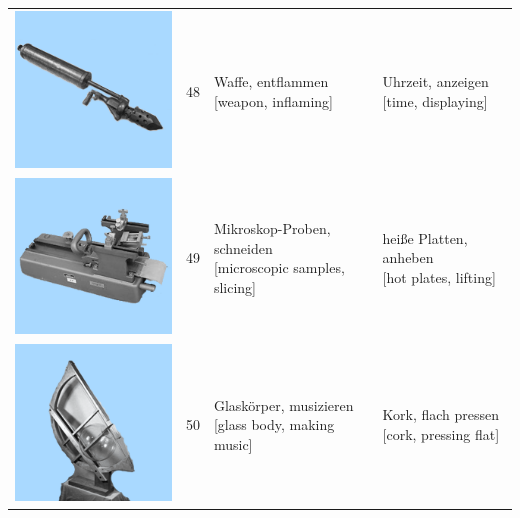 \documentclass[
  english,
  doc,12pt,twoside,floatsintext]{apa7}
\begin{document}
\begin{center}
\begin{ThreePartTable}
{\begin{longtable}{llll}
\includegraphics[valign=c, scale=0.23]{../materials/unfamiliar/48.png} & 48 & \makecell[l]{Waffe, entflammen\\{[weapon, inflaming]}} & \makecell[l]{Uhrzeit, anzeigen\\{[time, displaying]}}\\
\includegraphics[valign=c, scale=0.23]{../materials/unfamiliar/49.png} & 49 & \makecell[l]{Mikroskop-Proben, schneiden\\{[microscopic samples, slicing]}} & \makecell[l]{heiße Platten, anheben\\{[hot plates, lifting]}}\\
\includegraphics[valign=c, scale=0.23]{../materials/unfamiliar/50.png} & 50 & \makecell[l]{Glaskörper, musizieren\\{[glass body, making music]}} & \makecell[l]{Kork, flach pressen\\{[cork, pressing flat]}}\\

\end{longtable}}
\end{ThreePartTable}
\end{center}
\end{document}
